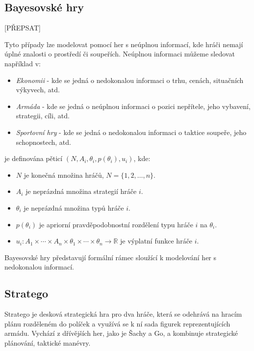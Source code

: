 \subsection{Bayesovské hry}
{\color {red} [PŘEPSAT]}


Tyto případy lze modelovat pomocí her s neúplnou informací, kde hráči nemají úplné znalosti o prostředí či soupeřích.
Neúplnou informaci můžeme sledovat například v:
\begin{itemize}
  \item \emph{Ekonomii} - kde se jedná o nedokonalou informaci o trhu, cenách, situačních výkyvech, atd.
  \item \emph{Armáda} - kde se jedná o neúplnou informaci o pozici nepřítele, jeho vybavení, strategii, cíli, atd.
  \item \emph{Sportovní hry} - kde se jedná o nedokonalou informaci o taktice soupeře, jeho schopnostech, atd.
\end{itemize}

\begin{definition}
\cite{Y_Narahari} je definována pěticí $(N, A_i, \theta_i, p(\theta_i), u_i)$, kde:

\begin{itemize}
\item $N$ je konečná množina hráčů, $N = \{1, 2, \ldots, n\}$.
\item $A_i$ je neprázdná množina strategií hráče $i$.
\item $\theta_i$ je neprázdná množina typů hráče $i$.
\item $p(\theta_i)$ je apriorní pravděpodobnostní rozdělení typu hráče $i$ na $\theta_i$.
\item $u_i: A_1 \times \cdots \times A_n \times \theta_1 \times \cdots \times \theta_n \rightarrow \mathbb{R}$ je výplatní funkce hráče $i$.
\end{itemize}
\end{definition}
Bayesovské hry představují formální rámec sloužící k modelování her s nedokonalou informací.

\subsection{Stratego}

Stratego je desková strategická hra pro dva hráče, která se odehrává na hracím plánu rozděleném do políček a využívá se k ní sada figurek reprezentujících armádu.
Vychází z dřívějších her, jako je Šachy a Go, a kombinuje strategické plánování, taktické manévry.

